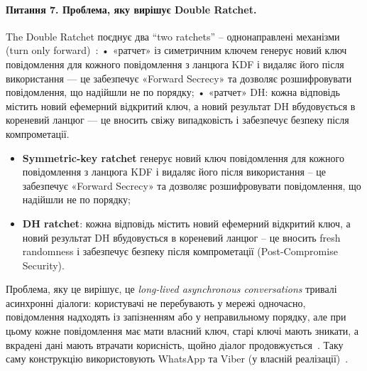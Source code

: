\paragraph{Питання 7. Проблема, яку вирішує Double Ratchet.}
The Double Ratchet поєднує два \enquote{two ratchets} -- однонаправлені механізми (turn only forward)~\cite{signal_double_ratchet}:
• «ратчет» із симетричним ключем генерує новий ключ повідомлення для кожного повідомлення з ланцюга
KDF і видаляє його після використання — це забезпечує «Forward Secrecy» та дозволяє розшифровувати
повідомлення, що надійшли не по порядку;
• «ратчет» DH: кожна відповідь містить новий ефемерний відкритий ключ, а новий результат DH
вбудовується в кореневий ланцюг — це вносить свіжу випадковість і забезпечує безпеку після
компрометації.
\begin{itemize}[noitemsep]
    \item \textbf{Symmetric-key ratchet} генерує новий ключ повідомлення для кожного повідомлення з ланцюга KDF 
        і видаляє його після використання -- це забезпечує «Forward Secrecy» та дозволяє розшифровувати повідомлення, 
        що надійшли не по порядку;
    \item \textbf{DH ratchet}: кожна відповідь містить новий ефемерний відкритий ключ, а новий результат DH
        вбудовується в кореневий ланцюг -- це вносить fresh randomness і забезпечує безпеку після компрометації 
        (Post-Compromise Security).
\end{itemize}
Проблема, яку це вирішує, це \emph{long-lived asynchronous conversations} тривалі асинхронні діалоги: користувачі 
не перебувають у мережі одночасно, повідомлення надходять із запізненням або у неправильному порядку, але при 
цьому кожне повідомлення має мати власний ключ, старі ключі мають зникати, а вкрадені дані мають втрачати корисність, 
щойно діалог продовжується~\cite{signal_double_ratchet}. Таку саму конструкцію використовують WhatsApp та Viber 
(у власній реалізації)~\cite{whatsapp_whitepaper, viber_overview}.

